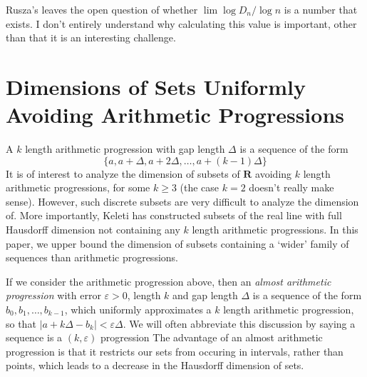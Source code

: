 \documentclass{article}
\theoremstyle{plain}
\theoremstyle{plain}
\begin{document}
Rusza's leaves the open question of whether $\lim \log D_n / \log n$ is a number that exists. I don't entirely understand why calculating this value is important, other than that it is an interesting challenge.

\section{Dimensions of Sets Uniformly Avoiding Arithmetic Progressions}

A $k$ length arithmetic progression with gap length $\Delta$ is a sequence of the form
%
\[ \{ a, a + \Delta, a + 2 \Delta, \dots, a + (k-1) \Delta \} \]
%
It is of interest to analyze the dimension of subsets of $\mathbf{R}$ avoiding $k$ length arithmetic progressions, for some $k \geq 3$ (the case $k = 2$ doesn't really make sense). However, such discrete subsets are very difficult to analyze the dimension of. More importantly, Keleti has constructed subsets of the real line with full Hausdorff dimension not containing any $k$ length arithmetic progressions. In this paper, we upper bound the dimension of subsets containing a `wider' family of sequences than arithmetic progressions.

If we consider the arithmetic progression above, then an {\it almost arithmetic progression} with error $\varepsilon > 0$, length $k$ and gap length $\Delta$ is a sequence of the form $b_0, b_1, \dots, b_{k-1}$, which uniformly approximates a $k$ length arithmetic progression, so that $|a + k \Delta - b_k| < \varepsilon \Delta$. We will often abbreviate this discussion by saying a sequence is a $(k,\varepsilon)$ progression The advantage of an almost arithmetic progression is that it restricts our sets from occuring in intervals, rather than points, which leads to a decrease in the Hausdorff dimension of sets.
\end{document}
